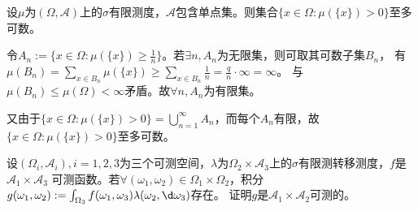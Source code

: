 \documentclass{ctexart}
\begin{document}
\begin{problem}\label{pro:3.40}
  设\(\mu \)为\((\Omega,\mathcal{A}) \)上的\(\sigma \)有限测度，\(\mathcal{A} \)包含单点集。则集合\(\{x \in \Omega: \mu(\{x\}) > 0\} \)至多可数。
\end{problem}
\begin{solution}
  令\(A_n := \{x \in \Omega:\mu(\{x\}) \geq \frac{1}{n}\} \)。若\(\exists n,A_n \)为无限集，则可取其可数子集\(B_n \)，
  有\(\mu(B_n) = \sum_{x \in B_n}\mu(\{x\}) \geq \sum_{x \in B_n}\frac{1}{n} = \frac{q}{n} \cdot \infty = \infty\)。
  与\(\mu(B_n) \leq \mu(\Omega) < \infty \)矛盾。故\(\forall n,A_n \)为有限集。

  又由于\(\{x \in \Omega:\mu(\{x\}) >0\} = \bigcup_{n = 1}^{\infty}A_n \)，而每个\(A_n \)有限，故\(\{x \in \Omega:\mu(\{x\})>0\} \)至多可数。
\end{solution}
\begin{problem}\label{pro:4.4}
  设\((\Omega_i,\mathcal{A}_i),i = 1,2,3 \)为三个可测空间，\(\lambda \)为\(\Omega_2 \times \mathcal{A}_{3} \)上的\(\sigma \)有限测转移测度，\(f \)是\(\mathcal{A}_1 \times \mathcal{A}_{3} \)
  可测函数。若\(\forall (\omega_1,\omega_{2})\in \Omega_1 \times \Omega_{2} \)，积分\(g(\omega_1,\omega_{2}):=\int_{\Omega_{3}} f(\omega_1,\omega_{3}) \lambda(\omega_2,\d \omega_{3}) \)存在。
  证明\(g \)是\(\mathcal{A}_1 \times \mathcal{A}_{2} \)可测的。
\end{problem}
\end{document}
